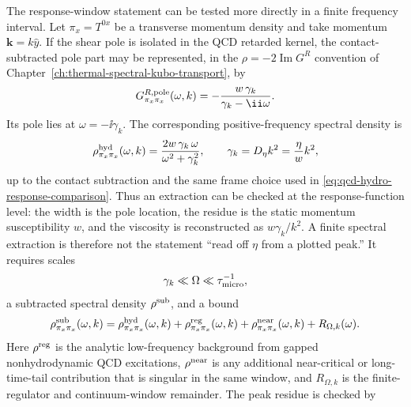 \begin{controlledapproximation}
\label{ca:qcd-finite-shear-spectral-window}
The response-window statement can be tested more directly in a finite
frequency interval.  Let
\(\pi_x=T^{0x}\) be a transverse momentum density and take momentum
\(\mathbf k=k\hat y\).  If the shear pole is isolated in the QCD retarded
kernel, the contact-subtracted pole part may be represented, in the
\(\rho=-2\operatorname{Im}G^R\) convention of
Chapter~\ref{ch:thermal-spectral-kubo-transport}, by
\begin{equation}
  G_{\pi_x\pi_x}^{R,{\rm pole}}(\omega,k)
  =
  -\frac{w\,\gamma_k}{\gamma_k-\ii\omega}.
  \label{eq:qcd-shear-retarded-pole-kernel}
\end{equation}
Its pole lies at \(\omega=-\ii\gamma_k\).  The corresponding
positive-frequency spectral density is
\begin{equation}
  \rho^{\rm hyd}_{\pi_x\pi_x}(\omega,k)
  =
  \frac{2w\,\gamma_k\,\omega}{\omega^2+\gamma_k^2},
  \qquad
  \gamma_k=D_\eta k^2=\frac{\eta}{w}k^2,
  \label{eq:qcd-shear-hydro-spectral-peak}
\end{equation}
up to the contact subtraction and the same frame choice used in
\eqref{eq:qcd-hydro-response-comparison}.
Thus an extraction can be checked at the response-function level: the width is
the pole location, the residue is the static momentum susceptibility \(w\), and
the viscosity is reconstructed as \(w\gamma_k/k^2\).  A finite spectral
extraction is
therefore not the statement ``read off \(\eta\) from a plotted peak.''  It
requires scales
\begin{equation}
  \gamma_k\ll\Omega\ll \tau_{\rm micro}^{-1},
  \label{eq:qcd-shear-spectral-window-scale-separation}
\end{equation}
a subtracted spectral density \(\rho^{\rm sub}\), and a bound
\begin{equation}
  \rho^{\rm sub}_{\pi_x\pi_x}(\omega,k)
  =
  \rho^{\rm hyd}_{\pi_x\pi_x}(\omega,k)
  +
  \rho^{\rm reg}_{\pi_x\pi_x}(\omega,k)
  +
  \rho^{\rm near}_{\pi_x\pi_x}(\omega,k)
  +
  R_{\Omega,k}(\omega).
  \label{eq:qcd-shear-spectral-window-decomposition}
\end{equation}
Here \(\rho^{\rm reg}\) is the analytic low-frequency background from gapped
nonhydrodynamic QCD excitations, \(\rho^{\rm near}\) is any additional
near-critical or long-time-tail contribution that is singular in the same
window, and \(R_{\Omega,k}\) is the finite-regulator and continuum-window
remainder.  The peak residue is checked by

\end{controlledapproximation}
